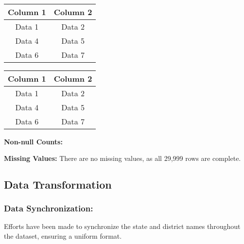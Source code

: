 \documentclass[12pt]{article}
\begin{document}
\begin{center}
\begin{tabular}{||c|c||}
\hline
\hline
\rowcolor[HTML]{89A8B2} Column 1 & Column 2 \\
\hline
\hline
\rowcolor[HTML]{F8FAFC} Data 1 & Data 2 \\ %
\hline

\rowcolor[HTML]{D8EFD3} Data 4 & Data 5 \\
\hline

\rowcolor[HTML]{F8FAFC} Data 6 & Data 7 \\ %
\hline
\hline
\end{tabular}
\end{center}
\bigskip %
\begin{center}
\begin{tabular}{||c|c||}
\hline
\hline
\rowcolor[HTML]{89A8B2} Column 1 & Column 2 \\
\hline
\hline
\rowcolor[HTML]{F8FAFC} Data 1 & Data 2 \\ %
\hline

\rowcolor[HTML]{D8EFD3} Data 4 & Data 5 \\
\hline

\rowcolor[HTML]{F8FAFC} Data 6 & Data 7 \\ %
\hline
\hline
\end{tabular}
\end{center}
\bigskip %


\textbf{Non-null Counts: }

\textbf{Missing Values: }There are no missing values, as all 29,999 rows are complete.
\vspace{5pt}

\subsection{Data Transformation}

\subsubsection{Data Synchronization: } Efforts have been made to synchronize the state and district names throughout the dataset, ensuring a uniform format.
\end{document}
